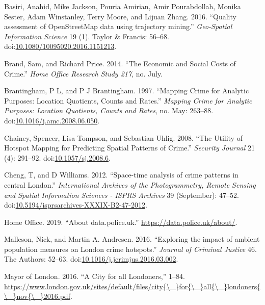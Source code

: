\documentclass[]{article}
\begin{document}
\hypertarget{ref-Basiri2016}{}
Basiri, Anahid, Mike Jackson, Pouria Amirian, Amir Pourabdollah, Monika
Sester, Adam Winstanley, Terry Moore, and Lijuan Zhang. 2016. ``Quality
assessment of OpenStreetMap data using trajectory mining.''
\emph{Geo-Spatial Information Science} 19 (1). Taylor \& Francis:
56--68.
doi:\href{https://doi.org/10.1080/10095020.2016.1151213}{10.1080/10095020.2016.1151213}.

\hypertarget{ref-Brand2014}{}
Brand, Sam, and Richard Price. 2014. ``The Economic and Social Costs of
Crime.'' \emph{Home Office Research Study 217}, no. July.

\hypertarget{ref-Brantingham1997}{}
Brantingham, P L, and P J Brantingham. 1997. ``Mapping Crime for
Analytic Purposes: Location Quotients, Counts and Rates.'' \emph{Mapping
Crime for Analytic Purposes: Location Quotients, Counts and Rates}, no.
May: 263--88.
doi:\href{https://doi.org/10.1016/j.amc.2008.06.050}{10.1016/j.amc.2008.06.050}.

\hypertarget{ref-Chainey2008}{}
Chainey, Spencer, Lisa Tompson, and Sebastian Uhlig. 2008. ``The Utility
of Hotspot Mapping for Predicting Spatial Patterns of Crime.''
\emph{Security Journal} 21 (4): 291--92.
doi:\href{https://doi.org/10.1057/sj.2008.6}{10.1057/sj.2008.6}.

\hypertarget{ref-Cheng2012}{}
Cheng, T, and D Williams. 2012. ``Space-time analysis of crime patterns
in central London.'' \emph{International Archives of the Photogrammetry,
Remote Sensing and Spatial Information Sciences - ISPRS Archives} 39
(September): 47--52.
doi:\href{https://doi.org/10.5194/isprsarchives-XXXIX-B2-47-2012}{10.5194/isprsarchives-XXXIX-B2-47-2012}.

\hypertarget{ref-Office2019}{}
Home Office. 2019. ``About data.police.uk.''
\url{https://data.police.uk/about/}.

\hypertarget{ref-Malleson2016}{}
Malleson, Nick, and Martin A. Andresen. 2016. ``Exploring the impact of
ambient population measures on London crime hotspots.'' \emph{Journal of
Criminal Justice} 46. The Authors: 52--63.
doi:\href{https://doi.org/10.1016/j.jcrimjus.2016.03.002}{10.1016/j.jcrimjus.2016.03.002}.

\hypertarget{ref-MayorofLondon2016}{}
Mayor of London. 2016. ``A City for all Londoners,'' 1--84.
\href{https://www.london.gov.uk/sites/default/files/city\%7B/_\%7Dfor\%7B/_\%7Dall\%7B/_\%7Dlondoners\%7B/_\%7Dnov\%7B/_\%7D2016.pdf}{https://www.london.gov.uk/sites/default/files/city\{\textbackslash{}\_\}for\{\textbackslash{}\_\}all\{\textbackslash{}\_\}londoners\{\textbackslash{}\_\}nov\{\textbackslash{}\_\}2016.pdf}.
\end{document}
